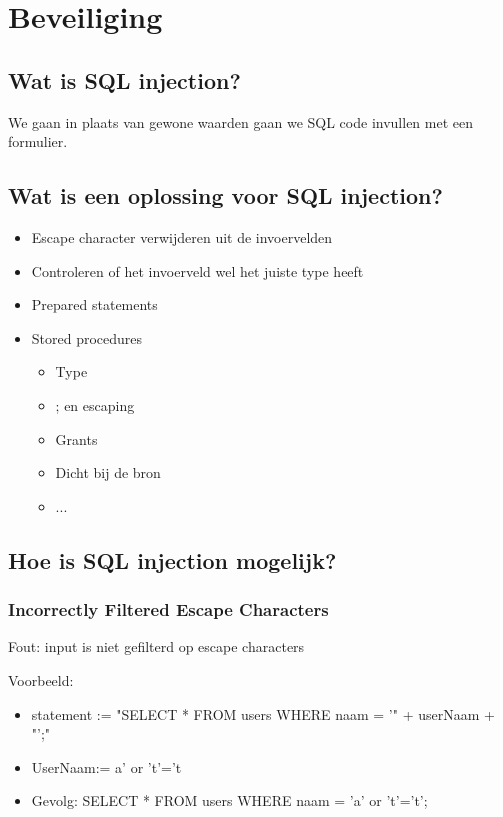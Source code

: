 \newpage
\section{Beveiliging}

\subsection{Wat is SQL injection?}

We gaan in plaats van gewone waarden gaan we SQL code invullen met een formulier.

\subsection{Wat is een oplossing voor SQL injection?}


\begin{itemize}
\item Escape character verwijderen uit de invoervelden
\item Controleren of het invoerveld wel het juiste type heeft
    
\item Prepared statements
\item Stored procedures
\begin{itemize}
        \item Type
         \item ; en escaping
        \item Grants
        \item Dicht bij de bron
        \item ...
    \end{itemize}
\end{itemize}

\subsection{Hoe is SQL injection mogelijk?}

\subsubsection{Incorrectly Filtered Escape Characters}

Fout: input is niet gefilterd op escape characters

Voorbeeld:

\begin{itemize}
\item statement := "SELECT * FROM users WHERE naam = '" + userNaam + "';"
\item UserNaam:= a' or 't'='t
\item Gevolg: SELECT * FROM users WHERE naam = 'a' or 't'='t';
\end{itemize}

